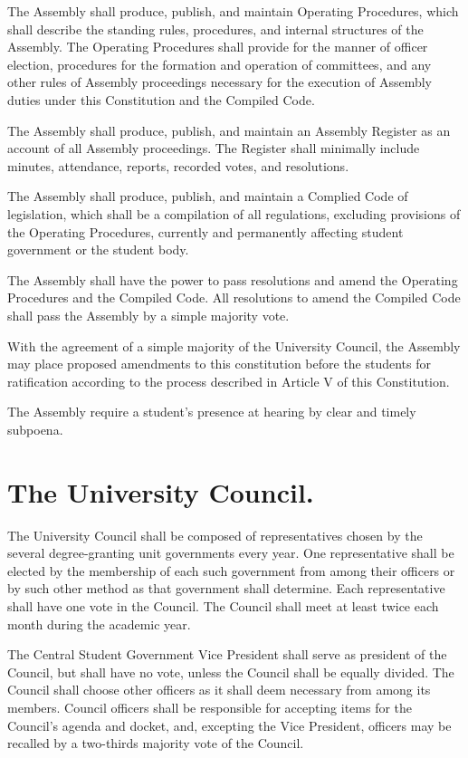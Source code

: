     The Assembly shall produce, publish, and maintain Operating Procedures, which shall describe the standing rules, procedures, and internal structures of the Assembly. The Operating Procedures shall provide for the manner of officer election, procedures for the formation and operation of committees, and any other rules of Assembly proceedings necessary for the execution of Assembly duties under this Constitution and the Compiled Code.

    The Assembly shall produce, publish, and maintain an Assembly Register as an account of all Assembly proceedings. The Register shall minimally include minutes, attendance, reports, recorded votes, and resolutions.

    The Assembly shall produce, publish, and maintain a Complied Code of legislation, which shall be a compilation of all regulations, excluding provisions of the Operating Procedures, currently and permanently affecting student government or the student body.

     The Assembly shall have the power to pass resolutions and amend the Operating Procedures and the Compiled Code. All resolutions to amend the Compiled Code shall pass the Assembly by a simple majority vote.

     With the agreement of a simple majority of the University Council, the Assembly may place proposed amendments to this constitution before the students for ratification according to the process described in Article V of this Constitution.

    The Assembly require a student's presence at hearing by clear and timely subpoena.


\section{The University Council.}
    The University Council shall be composed of representatives chosen by the several degree-granting unit governments every year. One representative shall be elected by the membership of each such government from among their officers or by such other method as that government shall determine. Each representative shall have one vote in the Council. The Council shall meet at least twice each month during the academic year.

    The Central Student Government Vice President shall serve as president of the Council, but shall have no vote, unless the Council shall be equally divided. The Council shall choose other officers as it shall deem necessary from among its members. Council officers shall be responsible for accepting items for the Council's agenda and docket, and, excepting the Vice President, officers may be recalled by a two-thirds majority vote of the Council.
 

